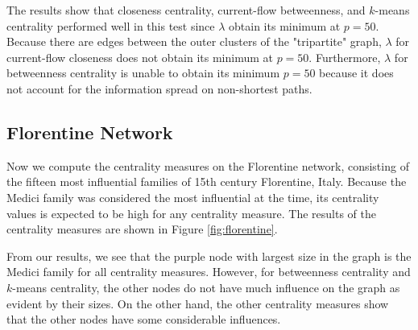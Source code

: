 \documentclass[10pt]{siamltex}
\begin{document}
\begin{pagewiselinenumbers}
The results show that closeness centrality, current-flow betweenness, and $k$-means centrality performed well in this test since $\lambda$ obtain its minimum at $p=50$. Because there are edges between the outer clusters of the "tripartite" graph, $\lambda$ for current-flow closeness does not obtain its minimum at $p=50$. Furthermore, $\lambda$ for betweenness centrality is unable to obtain its minimum $p = 50$ because it does not account for the information spread on non-shortest paths.

\subsection{Florentine Network}
Now we compute the centrality measures on the Florentine network, consisting of the fifteen most influential families of 15th century Florentine, Italy. Because the Medici family was considered the most influential at the time, its centrality values is expected to be high for any centrality measure. The results of the centrality measures are shown in Figure \ref{fig:florentine}.

From our results, we see that the purple node with largest size in the graph is the Medici family for all centrality measures. However, for betweenness centrality and $k$-means centrality, the other nodes do not have much influence on the graph as evident by their sizes. On the other hand, the other centrality measures show that the other nodes have some considerable influences.


\end{pagewiselinenumbers}
\end{document}
